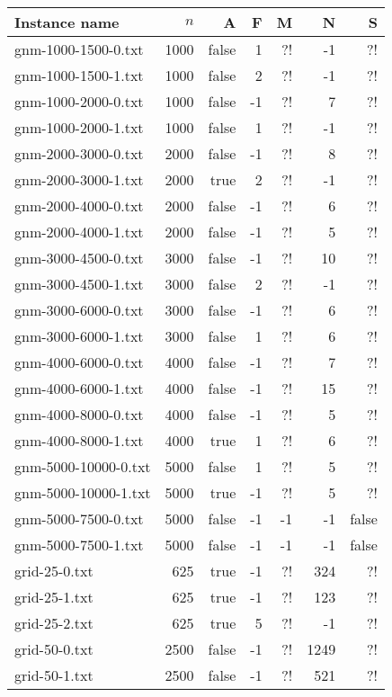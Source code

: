 \documentclass{tufte-handout}
\begin{document}
\begin{tabular}{lrrrrrr}
  \toprule
  Instance name & $n$ & A & F & M & N & S \\
  \midrule
  gnm-1000-1500-0.txt&	1000 &	false &	1 &	?! &	-1 &	?! &	\\
gnm-1000-1500-1.txt&	1000 &	false &	2 &	?! &	-1 &	?! &	\\
gnm-1000-2000-0.txt&	1000 &	false &	-1 &	?! &	7 &	?! &	\\
gnm-1000-2000-1.txt&	1000 &	false &	1 &	?! &	-1 &	?! &	\\
gnm-2000-3000-0.txt&	2000 &	false &	-1 &	?! &	8 &	?! &	\\
gnm-2000-3000-1.txt&	2000 &	true &	2 &	?! &	-1 &	?! &	\\
gnm-2000-4000-0.txt&	2000 &	false &	-1 &	?! &	6 &	?! &	\\
gnm-2000-4000-1.txt&	2000 &	false &	-1 &	?! &	5 &	?! &	\\
gnm-3000-4500-0.txt&	3000 &	false &	-1 &	?! &	10 &	?! &	\\
gnm-3000-4500-1.txt&	3000 &	false &	2 &	?! &	-1 &	?! &	\\
gnm-3000-6000-0.txt&	3000 &	false &	-1 &	?! &	6 &	?! &	\\
gnm-3000-6000-1.txt&	3000 &	false &	1 &	?! &	6 &	?! &	\\
gnm-4000-6000-0.txt&	4000 &	false &	-1 &	?! &	7 &	?! &	\\
gnm-4000-6000-1.txt&	4000 &	false &	-1 &	?! &	15 &	?! &	\\
gnm-4000-8000-0.txt&	4000 &	false &	-1 &	?! &	5 &	?! &	\\
gnm-4000-8000-1.txt&	4000 &	true &	1 &	?! &	6 &	?! &	\\
gnm-5000-10000-0.txt&	5000 &	false &	1 &	?! &	5 &	?! &	\\
gnm-5000-10000-1.txt&	5000 &	true &	-1 &	?! &	5 &	?! &	\\
gnm-5000-7500-0.txt&	5000 &	false &	-1 &	-1 &	-1 &	false &	\\
gnm-5000-7500-1.txt&	5000 &	false &	-1 &	-1 &	-1 &	false &	\\
grid-25-0.txt&	625 &	true &	-1 &	?! &	324 &	?! &	\\
grid-25-1.txt&	625 &	true &	-1 &	?! &	123 &	?! &	\\
grid-25-2.txt&	625 &	true &	5 &	?! &	-1 &	?! &	\\
grid-50-0.txt&	2500 &	false &	-1 &	?! &	1249 &	?! &	\\
grid-50-1.txt&	2500 &	false &	-1 &	?! &	521 &	?! &	\\

\end{tabular}
\end{document}
